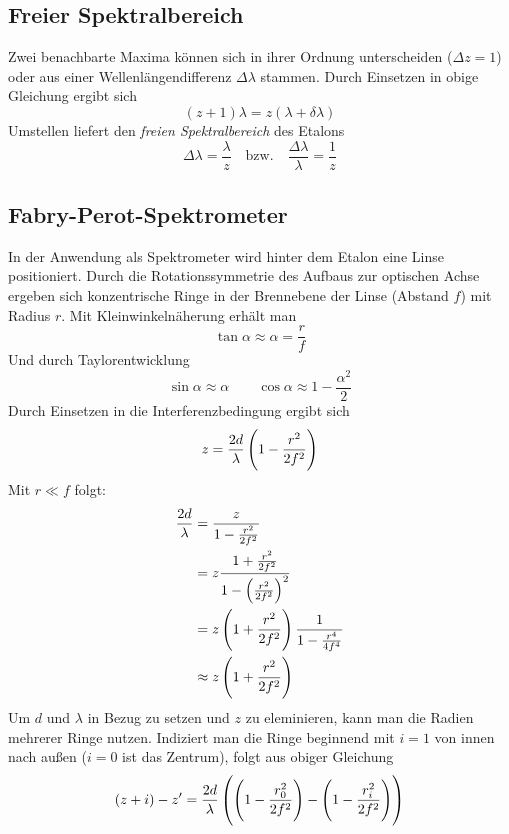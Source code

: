 \documentclass[a4paper,german,12pt,smallheadings]{scrartcl}
\begin{document}
\subsection{Freier Spektralbereich}
Zwei benachbarte Maxima können sich in ihrer Ordnung unterscheiden ($\Delta z =
1$) oder aus einer Wellenlängendifferenz $\Delta \lambda$ stammen. Durch
Einsetzen in obige Gleichung ergibt sich
\begin{equation}
(z+1) \lambda = z (\lambda + \delta \lambda)
\end{equation}
Umstellen liefert den \textit{freien Spektralbereich} des Etalons
\begin{equation}
\Delta \lambda = \frac{\lambda}{z} \quad \text{bzw.} \quad \frac{\Delta \lambda}{\lambda} = \frac{1}{z}
\end{equation}
\subsection{Fabry-Perot-Spektrometer}
In der Anwendung als Spektrometer wird hinter dem Etalon eine Linse
positioniert. Durch die Rotationssymmetrie des Aufbaus zur optischen Achse
ergeben sich konzentrische Ringe in der Brennebene der Linse (Abstand $f$) mit
Radius $r$. Mit Kleinwinkelnäherung erhält man
\begin{equation}
\tan \alpha \approx \alpha = \frac{r}{f}
\end{equation}
Und durch Taylorentwicklung
\begin{equation}
\sin \alpha \approx \alpha \qquad \cos \alpha \approx 1 - \frac{\alpha^2}{2}
\end{equation}
Durch Einsetzen in die Interferenzbedingung ergibt sich
\begin{equation}
z = \frac{2d}{\lambda} \del{1 - \frac{r^2}{2f^2}}
\label{eq:ord}
\end{equation}
Mit $r \ll f$ folgt:
\begin{align*}
\frac{2d}{\lambda} &= \frac{z}{1-\frac{r^2}{2f^2}} \\
&= z \frac{1+\frac{r^2}{2f^2}}{1 - \del{\frac{r^2}{2f^2}}^2} \\
&= z \del{1 + \frac{r^2}{2f^2}} \frac{1}{1 - \frac{r^4}{4f^4}} \\
&\approx z \del{1+\frac{r^2}{2f^2}}
\end{align*}
Um $d$ und $\lambda$ in Bezug zu setzen und $z$ zu eleminieren, kann man die
Radien mehrerer Ringe nutzen. Indiziert man die Ringe beginnend mit $i = 1$ von
innen nach außen ($i = 0$ ist das Zentrum), folgt aus obiger Gleichung
\begin{equation}
(z+i) - z' = \frac{2d}{\lambda} \del{\del{1-\frac{r_0^2}{2f^2}} - \del{1-\frac{r_i^2}{2f^2}}}
\end{equation}
\end{document}

